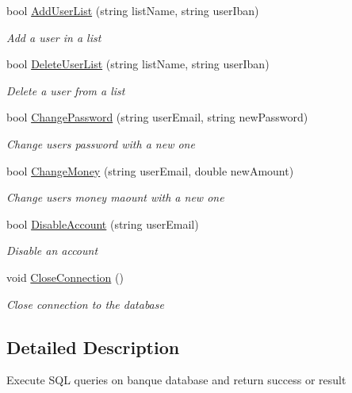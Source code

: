 \begin{DoxyCompactItemize}
bool \mbox{\hyperlink{class_projet_banque_1_1_database_management_ae74398d6164b328937cb35bbbb5c038f}{Add\+User\+List}} (string list\+Name, string user\+Iban)
\begin{DoxyCompactList}\small\item\em Add a user in a list \end{DoxyCompactList}\item 
bool \mbox{\hyperlink{class_projet_banque_1_1_database_management_aeb7e315638bb410c4a269cac784eee76}{Delete\+User\+List}} (string list\+Name, string user\+Iban)
\begin{DoxyCompactList}\small\item\em Delete a user from a list \end{DoxyCompactList}\item 
bool \mbox{\hyperlink{class_projet_banque_1_1_database_management_a1bfabac5efba52fdb4f2a1209f733b91}{Change\+Password}} (string user\+Email, string new\+Password)
\begin{DoxyCompactList}\small\item\em Change user\textquotesingle{}s password with a new one \end{DoxyCompactList}\item 
bool \mbox{\hyperlink{class_projet_banque_1_1_database_management_a690fc3be405a924031bb4cd505c78c02}{Change\+Money}} (string user\+Email, double new\+Amount)
\begin{DoxyCompactList}\small\item\em Change user\textquotesingle{}s money maount with a new one \end{DoxyCompactList}\item 
bool \mbox{\hyperlink{class_projet_banque_1_1_database_management_a0754fcad4a15737c428c29e2f08abfdb}{Disable\+Account}} (string user\+Email)
\begin{DoxyCompactList}\small\item\em Disable an account \end{DoxyCompactList}\item 
void \mbox{\hyperlink{class_projet_banque_1_1_database_management_aa825c23c3dd06796b8243ce8ed7c6bfb}{Close\+Connection}} ()
\begin{DoxyCompactList}\small\item\em Close connection to the database \end{DoxyCompactList}\end{DoxyCompactItemize}


\subsection{Detailed Description}
Execute S\+QL queries on banque database and return success or result 




